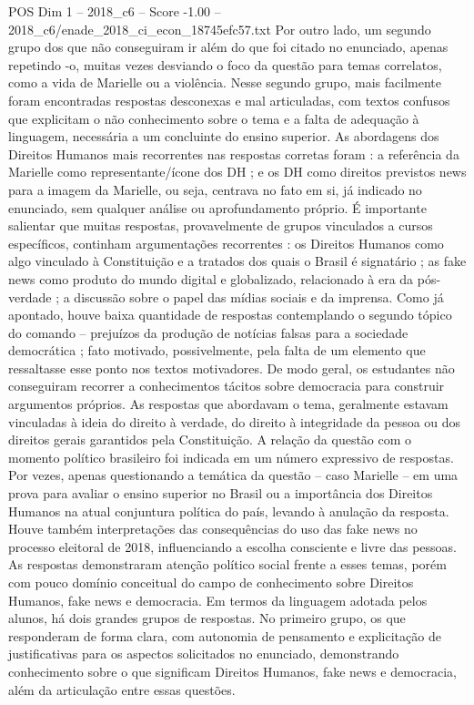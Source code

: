 \begin{textsample}{POS Dim 1 – 2018\_c6 – Score -1.00 – 2018\_c6/enade\_2018\_ci\_econ\_18745efc57.txt}
Por outro lado, um segundo grupo dos que não conseguiram ir além do que foi citado no enunciado, apenas repetindo -o, muitas vezes desviando o foco da questão para temas correlatos, como a vida de Marielle ou a violência.
Nesse segundo grupo, mais facilmente foram encontradas respostas desconexas e mal articuladas, com textos confusos que explicitam o não conhecimento sobre o tema e a falta de adequação à linguagem, necessária a um concluinte do ensino superior.
As abordagens dos Direitos Humanos mais recorrentes nas respostas corretas foram : a referência da Marielle como representante/ícone dos DH ; e os DH como direitos previstos news para a imagem da Marielle, ou seja, centrava no fato em si, já indicado no enunciado, sem qualquer análise ou aprofundamento próprio.
É importante salientar que muitas respostas, provavelmente de grupos vinculados a cursos específicos, continham argumentações recorrentes : os Direitos Humanos como algo vinculado à Constituição e a tratados dos quais o Brasil é signatário ; as fake news como produto do mundo digital e globalizado, relacionado à era da pós-verdade ; a discussão sobre o papel das mídias sociais e da imprensa.
Como já apontado, houve baixa quantidade de respostas contemplando o segundo tópico do comando – prejuízos da produção de notícias falsas para a sociedade democrática ; fato motivado, possivelmente, pela falta de um elemento que ressaltasse esse ponto nos textos motivadores.
De modo geral, os estudantes não conseguiram recorrer a conhecimentos tácitos sobre democracia para construir argumentos próprios.
As respostas que abordavam o tema, geralmente estavam vinculadas à ideia do direito à verdade, do direito à integridade da pessoa ou dos direitos gerais garantidos pela Constituição.
A relação da questão com o momento político brasileiro foi indicada em um número expressivo de respostas.
Por vezes, apenas questionando a temática da questão – caso Marielle – em uma prova para avaliar o ensino superior no Brasil ou a importância dos Direitos Humanos na atual conjuntura política do país, levando à anulação da resposta.
Houve também interpretações das consequências do uso das fake news no processo eleitoral de 2018, influenciando a escolha consciente e livre das pessoas.
As respostas demonstraram atenção político social frente a esses temas, porém com pouco domínio conceitual do campo de conhecimento sobre Direitos Humanos, fake news e democracia.
Em termos da linguagem adotada pelos alunos, há dois grandes grupos de respostas.
No primeiro grupo, os que responderam de forma clara, com autonomia de pensamento e explicitação de justificativas para os aspectos solicitados no enunciado, demonstrando conhecimento sobre o que significam Direitos Humanos, fake news e democracia, além da articulação entre essas questões.

\end{textsample}
